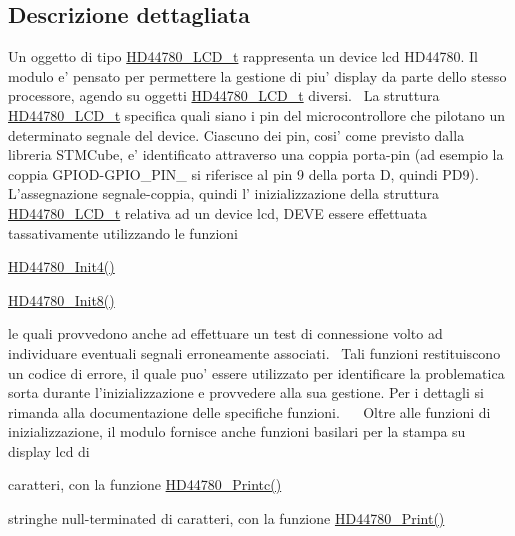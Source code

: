 \subsection{Descrizione dettagliata}
Un oggetto di tipo \hyperlink{struct_h_d44780___l_c_d__t}{H\+D44780\+\_\+\+L\+C\+D\+\_\+t} rappresenta un device lcd H\+D44780. Il modulo e' pensato per permettere la gestione di piu' display da parte dello stesso processore, agendo su oggetti \hyperlink{struct_h_d44780___l_c_d__t}{H\+D44780\+\_\+\+L\+C\+D\+\_\+t} diversi.~\newline
 La struttura \hyperlink{struct_h_d44780___l_c_d__t}{H\+D44780\+\_\+\+L\+C\+D\+\_\+t} specifica quali siano i pin del microcontrollore che pilotano un determinato segnale del device. Ciascuno dei pin, cosi' come previsto dalla libreria S\+T\+M\+Cube, e' identificato attraverso una coppia porta-\/pin (ad esempio la coppia G\+P\+I\+O\+D-\/\+G\+P\+I\+O\+\_\+\+P\+I\+N\+\_ si riferisce al pin 9 della porta D, quindi P\+D9). L'assegnazione segnale-\/coppia, quindi l' inizializzazione della struttura \hyperlink{struct_h_d44780___l_c_d__t}{H\+D44780\+\_\+\+L\+C\+D\+\_\+t} relativa ad un device lcd, D\+E\+V\+E essere effettuata tassativamente utilizzando le funzioni~\newline

\begin{DoxyItemize}
\item \hyperlink{group___h_d44780_gad8f777df204bc630b77924e0a96e5673}{H\+D44780\+\_\+\+Init4()}
\item \hyperlink{group___h_d44780_ga2df14171c71a8afda59e3ae1733c5469}{H\+D44780\+\_\+\+Init8()}~\newline

\end{DoxyItemize}

le quali provvedono anche ad effettuare un test di connessione volto ad individuare eventuali segnali erroneamente associati.~\newline
 Tali funzioni restituiscono un codice di errore, il quale puo' essere utilizzato per identificare la problematica sorta durante l'inizializzazione e provvedere alla sua gestione. Per i dettagli si rimanda alla documentazione delle specifiche funzioni.~\newline
 ~\newline
 Oltre alle funzioni di inizializzazione, il modulo fornisce anche funzioni basilari per la stampa su display lcd di
\begin{DoxyItemize}
\item caratteri, con la funzione \hyperlink{group___h_d44780_ga57b8c6ca0b3c12e5f7273b3c373a6f17}{H\+D44780\+\_\+\+Printc()}
\item stringhe null-\/terminated di caratteri, con la funzione \hyperlink{group___h_d44780_ga3aedff8e2040e62db569fde955d3987b}{H\+D44780\+\_\+\+Print()}~\newline

\end{DoxyItemize}

